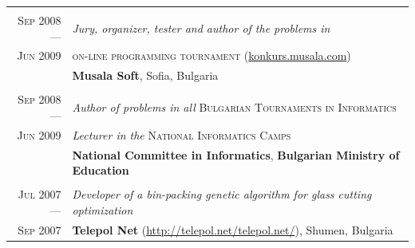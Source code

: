 \documentclass[a4paper,10pt]{article}
\def\myline{\color{linegray}\vline}
\newcommand{\minorcolor}[1]{\textcolor{mygray}{#1}}
\begin{document}
{\begin{tabular}{r!{\myline}p{14cm}}
	\\
	\textsc{Sep 2008 ---}     &  \textit{Jury, organizer, tester and \textit{author} of the problems in}\\
	\textsc{Jun 2009}        &  \textsc{on-line programming tournament} (\href{http://konkurs.musala.com/}{konkurs.musala.com})\\
	                          &  \textbf{Musala Soft}, Sofia, Bulgaria\\

	\\
	\textsc{Sep 2008 ---}     &  \textit{Author of problems in all} \textsc{Bulgarian Tournaments in Informatics}\\
	\textsc{Jun 2009}        &  \textit{Lecturer in the} \textsc{National Informatics Camps}\\
                                  &  \textbf{National Committee in Informatics}, \textbf{Bulgarian Ministry of Education}\\

	\\
	\textsc{Jul 2007 ---}     &  \textit{Developer of a bin-packing genetic algorithm for glass cutting optimization}\\
	\textsc{Sep 2007}        &  \textbf{Telepol Net} (\href{http://telepol.net/telepol.net/}{http://telepol.net/telepol.net/}), Shumen, Bulgaria\\
	
\end{tabular}

}
\end{document}
